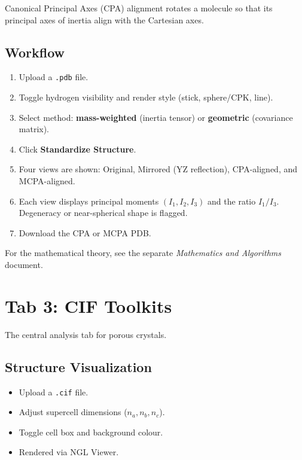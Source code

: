 \documentclass[11pt,a4paper]{article}
\begin{document}
Canonical Principal Axes (CPA) alignment rotates a molecule so that its
principal axes of inertia align with the Cartesian axes.

\subsection{Workflow}

\begin{enumerate}
    \item Upload a \texttt{.pdb} file.
    \item Toggle hydrogen visibility and render style (stick, sphere/CPK,
          line).
    \item Select method: \textbf{mass-weighted} (inertia tensor) or
          \textbf{geometric} (covariance matrix).
    \item Click \textbf{Standardize Structure}.
    \item Four views are shown: Original, Mirrored (YZ reflection),
          CPA-aligned, and MCPA-aligned.
    \item Each view displays principal moments $(I_1,I_2,I_3)$ and the
          ratio $I_1/I_3$.  Degeneracy or near-spherical shape is flagged.
    \item Download the CPA or MCPA PDB.
\end{enumerate}

For the mathematical theory, see the separate \textit{Mathematics and
Algorithms} document.

\section{Tab 3: CIF Toolkits}

The central analysis tab for porous crystals.

\subsection{Structure Visualization}

\begin{itemize}
    \item Upload a \texttt{.cif} file.
    \item Adjust supercell dimensions ($n_a,n_b,n_c$).
    \item Toggle cell box and background colour.
    \item Rendered via NGL Viewer.
\end{itemize}
\end{document}
